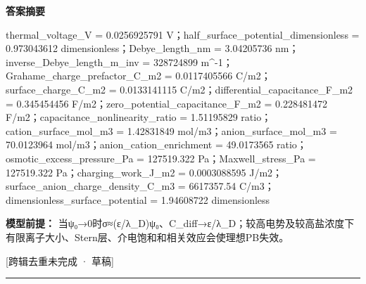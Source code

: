 \documentclass[UTF8,11pt,a4paper]{ctexart}
\begin{document}
\noindent\textbf{答案摘要}\par
thermal\_voltage\_V = 0.0256925791 V；half\_surface\_potential\_dimensionless = 0.973043612 dimensionless；Debye\_length\_nm = 3.04205736 nm；inverse\_Debye\_length\_m\_inv = 328724899 m\textasciicircum{}-1；Grahame\_charge\_prefactor\_C\_m2 = 0.0117405566 C/m2；surface\_charge\_C\_m2 = 0.0133141115 C/m2；differential\_capacitance\_F\_m2 = 0.345454456 F/m2；zero\_potential\_capacitance\_F\_m2 = 0.228481472 F/m2；capacitance\_nonlinearity\_ratio = 1.51195829 ratio；cation\_surface\_mol\_m3 = 1.42831849 mol/m3；anion\_surface\_mol\_m3 = 70.0123964 mol/m3；anion\_cation\_enrichment = 49.0173565 ratio；osmotic\_excess\_pressure\_Pa = 127519.322 Pa；Maxwell\_stress\_Pa = 127519.322 Pa；charging\_work\_J\_m2 = 0.0003088595 J/m2；surface\_anion\_charge\_density\_C\_m3 = 6617357.54 C/m3；dimensionless\_surface\_potential = 1.94608722 dimensionless\par
\noindent\textbf{模型前提：}
当ψ₀→0时σ≈(ε/λ\_D)ψ₀、C\_diff→ε/λ\_D；较高电势及较高盐浓度下有限离子大小、Stern层、介电饱和和相关效应会使理想PB失效。\par
\noindent\textcolor{red!65!black}{[跨辑去重未完成 · 草稿]} \par
\medskip\hrule\medskip
{}
\end{document}
